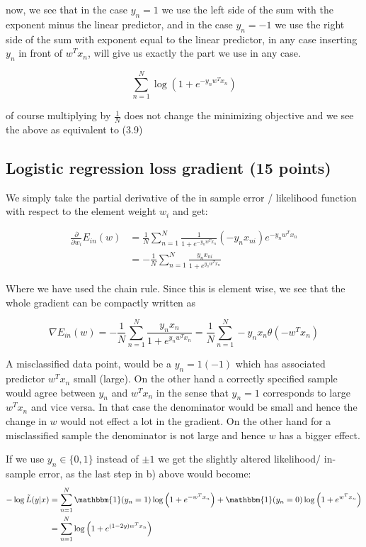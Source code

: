 \documentclass[a4paper,12pt]{article}
\begin{document}
now, we see that in the case $y_n = 1$ we use the left side of the sum with the exponent  minus the linear predictor, and in the case $y_n = -1$ we use the right side of the sum with exponent equal to the linear predictor, in any case inserting $y_n$ in front of $w^Tx_n$, will give us exactly the part we use in any case.

$$
\sum_{n=1}^N \log \left(1+e^{-y_nw^Tx_n} \right) 
$$

of course multiplying by $\frac{1}{N}$ does not change the minimizing objective and we see the above as equivalent to (3.9)


\subsection{Logistic regression loss gradient (15 points)}
We simply take the partial derivative of the in sample error / likelihood function with respect to the element weight $w_i$ and get:

\begin{align*}
   \frac{\partial }{\partial w_i} E_{in}(w) 
   &= \frac{1}{N} \sum_{n=1}^N \frac{1}{1+e^{-y_nw^Tx_n}} (-y_n x_{ni})  e^{-y_nw^Tx_n} \\
   &=  -\frac{1}{N} \sum_{n=1}^N \frac{y_n x_{ni} }{1+e^{y_nw^Tx_n}}
\end{align*}

Where we have used the chain rule. Since this is element wise, we see that the whole gradient can be compactly written as 

$$
\nabla	E_{in}(w)  =	-\frac{1}{N} \sum_{n=1}^N \frac{y_n x_n }{1+e^{y_nw^Tx_n}} = 
\frac{1}{N} \sum_{n=1}^N - y_n x_n \theta(-w^Tx_n)
$$

A misclassified data point, would be a $y_n = 1 (-1)$ which has associated predictor $w^Tx_n$ small (large). On the other hand a correctly specified sample would agree between $y_n$ and $w^Tx_n$ in the sense that $y_n = 1$ corresponds to large $w^Tx_n$ and vice versa. In that case the denominator would be small and hence the change in $w$ would not effect a lot in the gradient. On the other hand for a misclassified sample the denominator is not large and hence $w$ has a bigger effect.

If we use $y_n \in \{0,1\}$ instead of $\pm 1$ we get the slightly altered likelihood/ in-sample error, as the last step in b) above would become:
\begin{align*}
-\log \tilde{L}(y|x) &= 
\sum_{n=1}^N \mathbbm{1}(y_n = 1) \log \left(1+e^{-w^Tx_n} \right)  + 
\mathbbm{1}(y_n = 0)\log \left(1+e^{w^Tx_n} \right)   \\
&=\sum_{n=1}^N \log \left(1+e^{(1-2y)w^Tx_n} \right)  
\end{align*}
\end{document}
